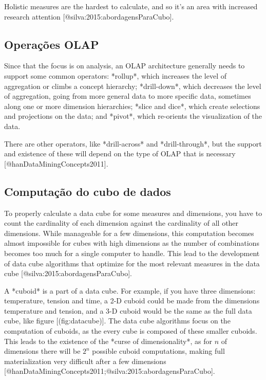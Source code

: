 Holistic measures are the hardest to calculate, and so it's an area with increased research attention [@silva:2015:abordagensParaCubo].

\subsection{Operações OLAP}
\label{ch:fun:olap:ops}

Since that the focus is on analysis, an OLAP architecture generally needs to support some common operators: *rollup*, which increases the level of aggregation or climbs a concept hierarchy; *drill-down*, which decreases the level of aggregation, going from more general data to more specific data, sometimes along one or more dimension hierarchies; *slice and dice*, which create selections and projections on the data; and *pivot*, which re-orients the visualization of the data.

There are other operators, like *drill-across* and *drill-through*, but the support and existence of these will depend on the type of OLAP that is necessary [@hanDataMiningConcepts2011].

\subsection{Computação do cubo de dados}

To properly calculate a data cube for some measures and dimensions, you have to count the cardinality of each dimension against the cardinality of all other dimensions.
While manageable for a few dimensions, this computation becomes almost impossible for cubes with high dimensions as the number of combinations becomes too much for a single computer to handle.
This lead to the development of data cube algorithms that optimize for the most relevant measures in the data cube [@silva:2015:abordagensParaCubo].

A *cuboid* is a part of a data cube. For example, if you have three dimensions: temperature, tension and time, a 2-D cuboid could be made from the dimensions temperature and tension, and a 3-D cuboid would be the same as the full data cube, like figure [\@ref(fig:datacube)].
The data cube algorithms focus on the computation of cuboids, as the every cube is composed of these smaller cuboids.
This leads to the existence of the *curse of dimensionality*, as for $n$ of dimensions there will be $2^n$ possible cuboid computations, making full materialization very difficult after a few dimensions [@hanDataMiningConcepts2011;@silva:2015:abordagensParaCubo].

